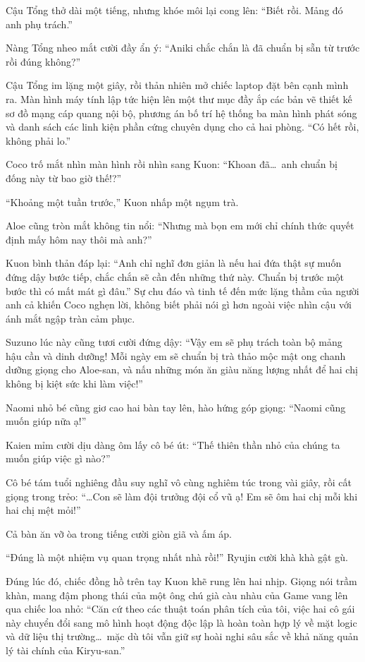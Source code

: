 ﻿\documentclass[../main.tex]{subfiles}
\begin{document}
Cậu Tổng thở dài một tiếng, nhưng khóe môi lại cong lên: ``Biết rồi. Mảng đó anh phụ trách.''

Nàng Tổng nheo mắt cười đầy ẩn ý: ``Aniki chắc chắn là đã chuẩn bị sẵn từ trước rồi đúng không?''

Cậu Tổng im lặng một giây, rồi thản nhiên mở chiếc laptop đặt bên cạnh mình ra. Màn hình máy tính lập tức hiện lên một thư mục đầy ắp các bản vẽ thiết kế sơ đồ mạng cáp quang nội bộ, phương án bố trí hệ thống ba màn hình phát sóng và danh sách các linh kiện phần cứng chuyên dụng cho cả hai phòng. ``Có hết rồi, không phải lo.''

Coco trố mắt nhìn màn hình rồi nhìn sang Kuon: ``Khoan đã\dots\ anh chuẩn bị đống này từ bao giờ thế!?''

``Khoảng một tuần trước,'' Kuon nhấp một ngụm trà.

Aloe cũng tròn mắt không tin nổi: ``Nhưng mà bọn em mới chỉ chính thức quyết định mấy hôm nay thôi mà anh?''

Kuon bình thản đáp lại: ``Anh chỉ nghĩ đơn giản là nếu hai đứa thật sự muốn đứng dậy bước tiếp, chắc chắn sẽ cần đến những thứ này. Chuẩn bị trước một bước thì có mất mát gì đâu.'' Sự chu đáo và tinh tế đến mức lặng thầm của người anh cả khiến Coco nghẹn lời, không biết phải nói gì hơn ngoài việc nhìn cậu với ánh mắt ngập tràn cảm phục.

Suzuno lúc này cũng tươi cười đứng dậy: ``Vậy em sẽ phụ trách toàn bộ mảng hậu cần và dinh dưỡng! Mỗi ngày em sẽ chuẩn bị trà thảo mộc mật ong chanh dưỡng giọng cho Aloe-san, và nấu những món ăn giàu năng lượng nhất để hai chị không bị kiệt sức khi làm việc!''

Naomi nhỏ bé cũng giơ cao hai bàn tay lên, hào hứng góp giọng: ``Naomi cũng muốn giúp nữa ạ!''

Kaien mỉm cười dịu dàng ôm lấy cô bé út: ``Thế thiên thần nhỏ của chúng ta muốn giúp việc gì nào?''

Cô bé tám tuổi nghiêng đầu suy nghĩ vô cùng nghiêm túc trong vài giây, rồi cất giọng trong trẻo: ``\dots Con sẽ làm đội trưởng đội cổ vũ ạ! Em sẽ ôm hai chị mỗi khi hai chị mệt mỏi!''

Cả bàn ăn vỡ òa trong tiếng cười giòn giã và ấm áp.

``Đúng là một nhiệm vụ quan trọng nhất nhà rồi!'' Ryujin cười khà khà gật gù.

Đúng lúc đó, chiếc đồng hồ trên tay Kuon khẽ rung lên hai nhịp. Giọng nói trầm khàn, mang đậm phong thái của một ông chú già càu nhàu của Game vang lên qua chiếc loa nhỏ: ``Căn cứ theo các thuật toán phân tích của tôi, việc hai cô gái này chuyển đổi sang mô hình hoạt động độc lập là hoàn toàn hợp lý về mặt logic và dữ liệu thị trường\dots\ mặc dù tôi vẫn giữ sự hoài nghi sâu sắc về khả năng quản lý tài chính của Kiryu-san.''
\end{document}
